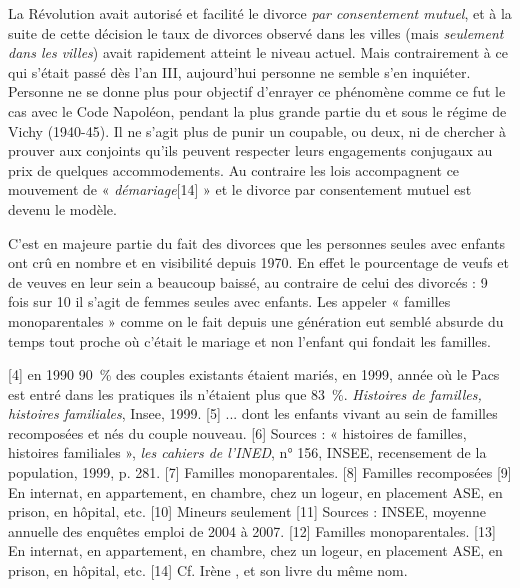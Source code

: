  La Révolution avait autorisé et facilité le divorce \emph{par consentement mutuel}, et à la suite de cette décision le taux de divorces observé dans les villes (mais \emph{seulement dans les villes}) avait rapidement atteint le niveau actuel. Mais contrairement à ce qui s'était passé dès l'an III, aujourd'hui personne ne semble s'en inquiéter. Personne ne se donne plus pour objectif d'enrayer ce phénomène comme ce fut le cas avec le Code Napoléon, pendant la plus grande partie du  et sous le régime de Vichy (1940-45). Il ne s'agit plus de punir un coupable, ou deux, ni de chercher à prouver aux conjoints qu'ils peuvent respecter leurs engagements conjugaux au prix de quelques accommodements. Au contraire les lois accompagnent ce mouvement de « \emph{démariage}[14] » et le divorce par consentement mutuel est devenu le modèle. 

 C'est en majeure partie du fait des divorces que les personnes seules avec enfants ont crû en nombre et en visibilité depuis 1970. En effet le pourcentage de veufs et de veuves en leur sein a beaucoup baissé, au contraire de celui des divorcés : 9 fois sur 10 il s'agit de femmes seules avec enfants. Les appeler « familles monoparentales » comme on le fait depuis une génération eut semblé absurde du temps tout proche où c'était le mariage et non l'enfant qui fondait les familles. 
 
[4] en 1990 90~\% des couples existants étaient mariés, en 1999, année où le Pacs est entré dans les pratiques ils n'étaient plus que 83~\%. \emph{Histoires de familles, histoires familiales}, Insee, 1999.
[5] ... dont les  enfants vivant au sein de familles recomposées et nés du couple nouveau.
[6] Sources : « histoires de familles, histoires familiales », \emph{les cahiers de l'INED}, n° 156, INSEE, recensement de la population, 1999, p. 281.
[7] Familles monoparentales.
[8] Familles recomposées
[9] En internat, en appartement, en chambre, chez un logeur, en placement ASE, en prison, en hôpital, etc.
[10] Mineurs seulement
[11] Sources : INSEE, moyenne annuelle des enquêtes emploi de 2004 à 2007.
[12] Familles monoparentales.
[13] En internat, en appartement, en chambre, chez un logeur, en placement ASE, en prison, en hôpital, etc.
[14] Cf. Irène , et son livre du même nom.